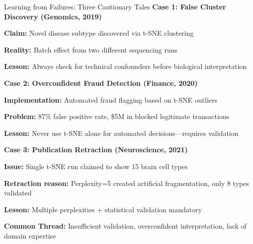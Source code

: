 \documentclass[aspectratio=169]{beamer}
\begin{document}
\begin{frame}{Learning from Failures: Three Cautionary Tales}
\textbf{Case 1: False Cluster Discovery (Genomics, 2019)}

\textbf{Claim:} Novel disease subtype discovered via t-SNE clustering

\textbf{Reality:} Batch effect from two different sequencing runs

\textbf{Lesson:} Always check for technical confounders before biological interpretation

\vspace{0.3cm}
\textbf{Case 2: Overconfident Fraud Detection (Finance, 2020)}

\textbf{Implementation:} Automated fraud flagging based on t-SNE outliers

\textbf{Problem:} 87\% false positive rate, \$5M in blocked legitimate transactions

\textbf{Lesson:} Never use t-SNE alone for automated decisions—requires validation

\vspace{0.3cm}
\textbf{Case 3: Publication Retraction (Neuroscience, 2021)}

\textbf{Issue:} Single t-SNE run claimed to show 15 brain cell types

\textbf{Retraction reason:} Perplexity=5 created artificial fragmentation, only 8 types validated

\textbf{Lesson:} Multiple perplexities + statistical validation mandatory

\vspace{0.3cm}
\colorbox{red!20}{\parbox{0.95\textwidth}{\centering\textbf{Common Thread:} Insufficient validation, overconfident interpretation, lack of domain expertise}}
\end{frame}
\end{document}
